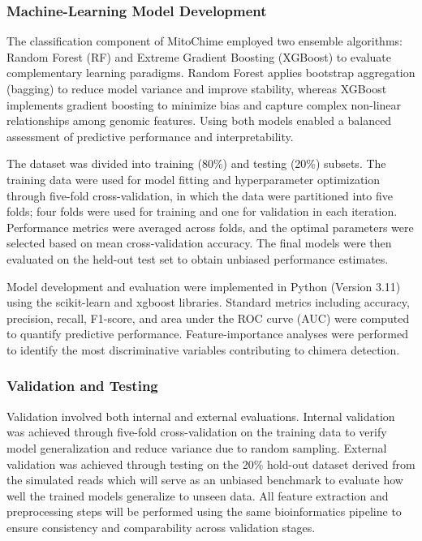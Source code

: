  \subsubsection{Machine-Learning Model Development} 
 The classification component of MitoChime employed two ensemble algorithms: Random Forest (RF) and Extreme Gradient Boosting (XGBoost) to evaluate complementary learning paradigms. Random Forest applies bootstrap aggregation (bagging) to reduce model variance and improve stability, whereas XGBoost implements gradient boosting to minimize bias and capture complex non-linear relationships among genomic features. Using both models enabled a balanced assessment of predictive performance and interpretability.

 The dataset was divided into training (80\%) and testing (20\%) subsets. The training data were used for model fitting and hyperparameter optimization through five-fold cross-validation, in which the data were partitioned into five folds; four folds were used for training and one for validation in each iteration. Performance metrics were averaged across folds, and the optimal parameters were selected based on mean cross-validation accuracy. The final models were then evaluated on the held-out test set to obtain unbiased performance estimates.

Model development and evaluation were implemented in Python (Version 3.11) using the scikit-learn and xgboost libraries. Standard metrics including accuracy, precision, recall, F1-score, and area under the ROC curve (AUC) were computed to quantify predictive performance. Feature-importance analyses were performed to identify the most discriminative variables contributing to chimera detection.

 \subsubsection{Validation and Testing} 
Validation involved both internal and external evaluations. Internal validation was achieved through five-fold cross-validation on the training data to verify model generalization and reduce variance due to random sampling. External validation was achieved through testing on the 20\% hold-out dataset derived from the simulated reads which will serve as an unbiased benchmark to evaluate how well the trained models generalize to unseen data. All feature extraction and preprocessing steps will be performed using the same bioinformatics pipeline to ensure consistency and comparability across validation stages.

